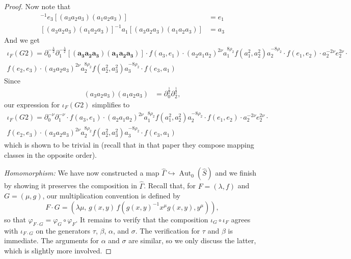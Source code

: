 \documentclass{amsart}
\newcommand{\Aut}{\operatorname{Aut}}
\newcommand{\NS}{\widehat{\mathsf{\Gamma}}}
\theoremstyle{definition}
\numberwithin{equation}{section}
\begin{document}
\begin{proof}
Now note that
    \begin{align*}
        [(a_3a_2a_3)(a_1 a_2 a_3)]^{-1}e_3[(a_3a_2a_3)(a_1 a_2 a_3)]&=e_1 \\
        [(a_3a_2a_3)(a_1 a_2 a_3)]^{-1}a_1[(a_3a_2a_3)(a_1 a_2 a_3)]&=a_3
    \end{align*}
And we get
    \begin{multline*}
        \iota_{F}(G2)=\partial_0^{-\frac{\lambda}{2}}\partial_1^{-\frac{\lambda}{2}}\mathbf{[(a_3a_2a_3)(a_1 a_2 a_3)]}\cdot f(a_3,e_1)\cdot (a_2 a_1 a_2)^{2\nu} a_1^{8\rho_2} f(a_1^2,a_2^2) a_2^{-8\rho_2} \cdot f(e_1,e_2) \cdot  a_2^{-2\nu} e_2^{2\nu} \cdot  \\ f(e_2,e_3) \cdot(a_3 a_2 a_3)^{2\nu} a_2^{8\rho_2} f(a_2^2,a_3^2) a_3^{-8\rho_2}\cdot f(e_3,a_1)
    \end{multline*}
Since
    \begin{align*}
        (a_3a_2a_3)(a_1 a_2 a_3)&= \partial_0^{\frac{1}{2}}\partial_2^{\frac{1}{2}},
    \end{align*}
our expression for $\iota_{F}(G2)$ simplifies to 
    \begin{multline*}
        \iota_{F}(G2)=\partial_0^{-\nu}\partial_1^{-\nu}\cdot f(a_3,e_1)\cdot (a_2 a_1 a_2)^{2\nu} a_1^{8\rho_2} f(a_1^2,a_2^2) a_2^{-8\rho_2} \cdot f(e_1,e_2) \cdot  a_2^{-2\nu} e_2^{2\nu} \cdot  \\ f(e_2,e_3) \cdot(a_3 a_2 a_3)^{2\nu} a_2^{8\rho_2} f(a_2^2,a_3^2) a_3^{-8\rho_2}\cdot f(e_3,a_1)
    \end{multline*}
which is shown to be trivial in \cite[Proof of Claim 8.3, relation (6AS), end of page 542]{Nakamura-Schneps} (recall that in that paper they compose mapping classes in the opposite order).

\medskip 

\emph{Homomorphism:} We have now constructed a map $\NS\hookrightarrow\Aut_0(\hat{S})$ and we finish by showing it preserves the composition in $\NS$. Recall that, for \(F=(\lambda,f)\) and \(G=(\mu,g)\), our multiplication
convention is defined by
\[
F\cdot G
=
(\lambda\mu,\,
g(x,y)\,f(g(x,y)^{-1}x^\mu g(x,y),y^\mu)),
\]
so that \(\varphi_{F\cdot G}=\varphi_G\circ\varphi_F\).  It remains to verify that the composition $\iota_G\circ \iota_F$ agrees with $\iota_{F\cdot G}$ on the generators $\tau$, $\beta$, $\alpha$, and $\sigma$. The verification for $\tau$ and $\beta$ is immediate. The arguments for $\alpha$ and $\sigma$ are similar, so we only discuss the latter, which is slightly more involved.


\end{proof}
\end{document}
